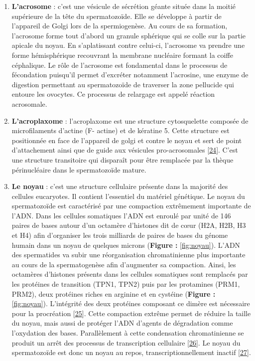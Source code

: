 \documentclass[12pt,twoside]{ugathesis}
\theoremstyle{definition}
\theoremstyle{definition}
\theoremstyle{remark}
\begin{document}
\begin{enumerate}
\def\labelenumi{\arabic{enumi}.}
\item
  \textbf{L'acrosome} : c'est une vésicule de sécrétion géante située
  dans la moitié supérieure de la tête du spermatozoïde. Elle se
  développe à partir de l'appareil de Golgi lors de la spermiogenèse. Au
  cours de sa formation, l'acrosome forme tout d'abord un granule
  sphérique qui se colle sur la partie apicale du noyau. En
  s'aplatissant contre celui-ci, l'acrosome va prendre une forme
  hémisphérique recouvrant la membrane nucléaire formant la coiffe
  céphalique. Le rôle de l'acrosome est fondamental dans le processus de
  fécondation puisqu'il permet d'excréter notamment l'acrosine, une
  enzyme de digestion permettant au spermatozoïde de traverser la zone
  pellucide qui entoure les ovocytes. Ce processus de relargage est
  appelé réaction acrosomale.
\item
  \textbf{L'acroplaxome} : l'acroplaxome est une structure cytosquelette
  composée de microfilaments d'actine (F- actine) et de kératine 5.
  Cette structure est positionnée en face de l'appareil de golgi et
  contre le noyau et sert de point d'attachement ainsi que de guide aux
  vésicules pro-acrosomales
  {[}\protect\hyperlink{ref-Kierszenbaum2004}{24}{]}. C'est une
  structure transitoire qui disparaît pour être remplacée par la thèque
  périnucléaire dans le spermatozoïde mature.
\item
  \textbf{Le noyau} : c'est une structure cellulaire présente dans la
  majorité des cellules eucaryotes. Il contient l'essentiel du matériel
  génétique. Le noyau du spermatozoïde est caractérisé par une
  compaction extrêmement importante de l'ADN. Dans les cellules
  somatiques l'ADN est enroulé par unité de 146 paires de bases autour
  d'un octamère d'histones dit de cœur (H2A, H2B, H3 et H4) afin
  d'organiser les trois milliards de paires de bases du génome humain
  dans un noyau de quelques microns (\textbf{Figure : }\ref{fig:noyau}).
  L'ADN des spermatides va subir une réorganisation chromatinienne plus
  importante au cours de la spermatogenèse afin d'augmenter sa
  compaction. Ainsi, les octamères d'histones présents dans les cellules
  somatiques sont remplacés par les protéines de transition (TPN1, TPN2)
  puis par les protamines (PRM1, PRM2), deux protéines riches en
  arginine et en cystéine (\textbf{Figure : }\ref{fig:noyau}).
  L'intégrité des deux protéines composant ce dimère est nécessaire pour
  la procréation {[}\protect\hyperlink{ref-Cho2001}{25}{]}. Cette
  compaction extrême permet de réduire la taille du noyau, mais aussi de
  protéger l'ADN d'agents de dégradation comme l'oxydation des bases.
  Parallèlement à cette condensation chromatinienne se produit un arrêt
  des processus de transcription cellulaire
  {[}\protect\hyperlink{ref-Kierszenbaum1978}{26}{]}. Le noyau du
  spermatozoïde est donc un noyau au repos, transcriptionnellement
  inactif {[}\protect\hyperlink{ref-Ward1994}{27}{]}.
\end{enumerate}
\end{document}
